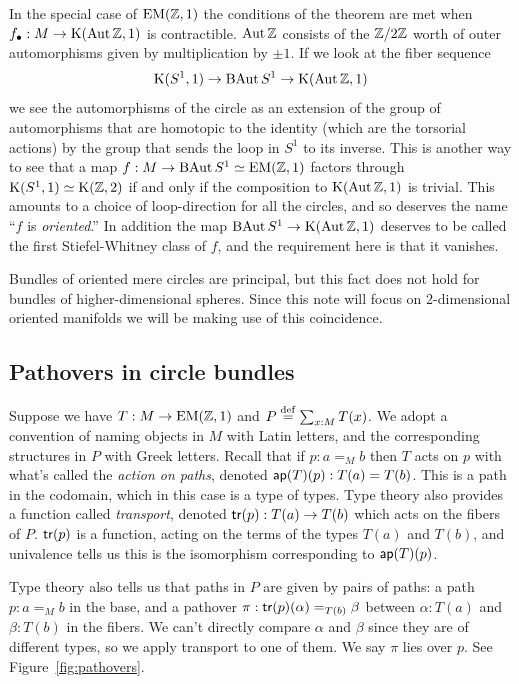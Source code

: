 In the special case of \( \mathrm{EM}(\mathbb{Z},1) \) the conditions of the theorem are met when \( f_\bullet:M\to\mathrm{K}(\operatorname{Aut} \mathbb{Z}, 1) \) is contractible. \( \operatorname{Aut}\mathbb{Z} \) consists of the \( \mathbb{Z}/2\mathbb{Z} \) worth of outer automorphisms given by multiplication by \( \pm 1 \). If we look at the fiber sequence
\[ 
\mathrm{K}(S^1, 1)\to \operatorname{BAut} S^1\to \mathrm{K}(\operatorname{Aut} \mathbb{Z}, 1)
\] we see the automorphisms of the circle as an extension of the group of automorphisms that are homotopic to the identity (which are the torsorial actions) by the group that sends the loop in \( S^1 \) to its inverse. This is another way to see that a map \( f:M\to \operatorname{BAut} S^1\simeq \mathrm{EM}(\mathbb{Z},1) \) factors through \( \mathrm{K}(S^1, 1)\simeq \mathrm{K}(\mathbb{Z},2) \) if and only if the composition to \( \mathrm{K}(\operatorname{Aut}\mathbb{Z},1) \) is trivial. This amounts to a choice of loop-direction for all the circles, and so deserves the name ``\( f \) is \emph{oriented}.'' In addition the map \( \operatorname{BAut} S^1\to \mathrm{K}(\operatorname{Aut} \mathbb{Z}, 1) \) deserves to be called the first Stiefel-Whitney class of \( f \), and the requirement here is that it vanishes.

\begin{mynote}
Bundles of oriented mere circles are principal, but this fact does not hold for bundles of higher-dimensional spheres. Since this note will focus on 2-dimensional oriented manifolds we will be making use of this coincidence.
\end{mynote}

\subsection{Pathovers in circle bundles}
\label{sec:pathovers}
Suppose we have \( T:M\to\mathrm{EM}(\mathbb{Z},1) \) and \( P\stackrel{\mathrm{def}}{=}\sum_{x:M}T(x) \). We adopt a convention of naming objects in \( M \) with Latin letters, and the corresponding structures in \( P \) with Greek letters. Recall that if \( p:a=_M b \) then \( T \) acts on \( p \) with what's called the \emph{action on paths}, denoted \( \mathsf{ap}(T)(p):T(a)=T(b) \). This is a path in the codomain, which in this case is a type of types. Type theory also provides a function called \emph{transport}, denoted \( \mathsf{tr}(p):T(a)\to T(b) \) which acts on the fibers of \( P \). \( \mathsf{tr}(p) \) is a function, acting on the terms of the types \( T(a) \) and \( T(b) \), and univalence tells us this is the isomorphism corresponding to \( \mathsf{ap}(T)(p) \).

Type theory also tells us that paths in \( P \) are given by pairs of paths: a path \( p:a=_M b \) in the base, and a pathover \( \pi:\mathsf{tr}(p)(\alpha)=_{T(b)}\beta \) between \( \alpha:T(a) \) and \( \beta:T(b) \) in the fibers. We can't directly compare \( \alpha \) and \( \beta \) since they are of different types, so we apply transport to one of them. We say \( \pi \) lies over \( p \). See Figure~\ref{fig:pathovers}.

